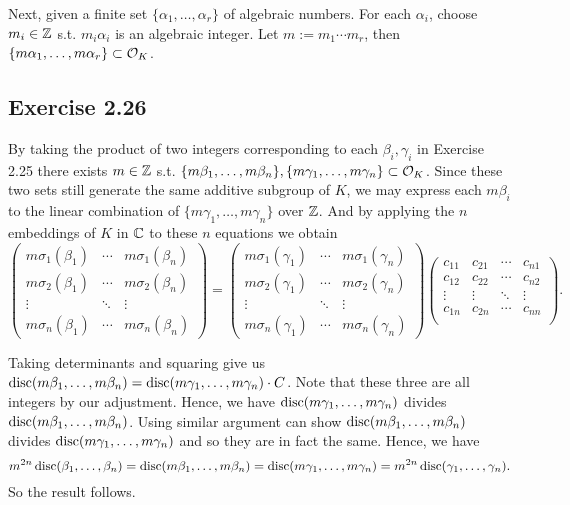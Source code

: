 \documentclass[../Marcus.tex]{subfiles}
\begin{document}
Next, given a finite set $\{\alpha_1,\ldots,\alpha_r\}$ of algebraic numbers. For each $\alpha_i$, choose $m_i\in \mathbb{Z}$ s.t. $m_i\alpha_i$ is an algebraic integer. Let $m:=m_1\cdots m_r$, then $\{m\alpha_1,\ldots,m\alpha_r\} \subset \mathcal{O}_K$.

\subsection*{Exercise 2.26}

By taking the product of two integers corresponding to each $\beta_i,\gamma_i$ in Exercise 2.25 there exists $m\in\mathbb{Z}$ s.t. $\{m\beta_1,\ldots,m\beta_n\},\{m\gamma_1,\ldots,m\gamma_n\}\subset\mathcal{O}_K$. Since these two sets still generate the same additive subgroup of $K$, we may express each $m\beta_i$ to the linear combination of $\{m\gamma_1,\ldots,m\gamma_n\}$ over $\mathbb{Z}$. And by applying the $n$ embeddings of $K$ in $\mathbb{C}$ to these $n$ equations we obtain
$$\begin{pmatrix}
    m\sigma_1(\beta_1)  &  \cdots & m\sigma_1(\beta_n)  \\
    m\sigma_2(\beta_1) &  \cdots & m\sigma_2(\beta_n)  \\
    \vdots                         &  \ddots & \vdots  \\
    m\sigma_n(\beta_1) &  \cdots & m\sigma_n(\beta_n)
\end{pmatrix}
=
\begin{pmatrix}
    m\sigma_1(\gamma_1)  &  \cdots & m\sigma_1(\gamma_n)  \\
    m\sigma_2(\gamma_1) &  \cdots & m\sigma_2(\gamma_n)  \\
    \vdots                         &  \ddots & \vdots  \\
    m\sigma_n(\gamma_1) &  \cdots & m\sigma_n(\gamma_n)
\end{pmatrix}
\begin{pmatrix}
    c_{11}  & c_{21} & \cdots & c_{n1} \\
    c_{12} & c_{22} & \cdots & c_{n2} \\
    \vdots & \vdots  & \ddots & \vdots \\
    c_{1n} & c_{2n} & \cdots & c_{nn} \\
\end{pmatrix}.
$$

Taking determinants and squaring give us $\operatorname{disc}(m\beta_1,\ldots,m\beta_n)=\operatorname{disc}(m\gamma_1,\ldots,m\gamma_n)\cdot C$. Note that these three are all integers by our adjustment. Hence, we have $\operatorname{disc}(m\gamma_1,\ldots,m\gamma_n)$ divides $\operatorname{disc}(m\beta_1,\ldots,m\beta_n)$. Using similar argument can show $\operatorname{disc}(m\beta_1,\ldots,m\beta_n)$ divides $\operatorname{disc}(m\gamma_1,\ldots,m\gamma_n)$ and so they are in fact the same. Hence, we have 
$$
m^{2n}\operatorname{disc}(\beta_1,\ldots,\beta_n)=\operatorname{disc}(m\beta_1,\ldots,m\beta_n)=\operatorname{disc}(m\gamma_1,\ldots,m\gamma_n)=m^{2n}\operatorname{disc}(\gamma_1,\ldots,\gamma_n).
$$ 
So the result follows.
\end{document}
